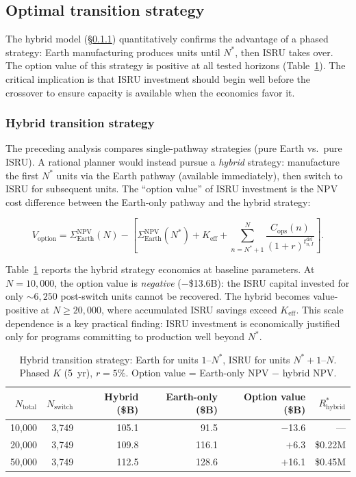 \documentclass[preprint,12pt]{elsarticle}
\begin{document}
\subsection{Optimal transition strategy}

The hybrid model (\S\ref{sec:hybrid}) quantitatively confirms the advantage of a phased strategy: Earth manufacturing produces units until $N^*$, then ISRU takes over. The option value of this strategy is positive at all tested horizons (Table~\ref{tab:hybrid}). The critical implication is that ISRU investment should begin well before the crossover to ensure capacity is available when the economics favor it.

\subsubsection{Hybrid transition strategy}
\label{sec:hybrid}

The preceding analysis compares single-pathway strategies (pure Earth vs.\ pure ISRU). A rational planner would instead pursue a \emph{hybrid} strategy: manufacture the first $N^*$ units via the Earth pathway (available immediately), then switch to ISRU for subsequent units. The ``option value'' of ISRU investment is the NPV cost difference between the Earth-only pathway and the hybrid strategy:

\begin{equation}
  V_{\mathrm{option}} = \Sigma_{\mathrm{Earth}}^{\mathrm{NPV}}(N) - \left[\Sigma_{\mathrm{Earth}}^{\mathrm{NPV}}(N^*) + K_{\mathrm{eff}} + \sum_{n=N^*+1}^{N} \frac{C_{\mathrm{ops}}(n)}{(1+r)^{t_{n,I}^{\mathrm{del}}}}\right].
  \label{eq:hybrid}
\end{equation}

Table~\ref{tab:hybrid} reports the hybrid strategy economics at baseline parameters. At $N = 10{,}000$, the option value is \emph{negative} ($-$\$13.6B): the ISRU capital invested for only ${\sim}6{,}250$ post-switch units cannot be recovered. The hybrid becomes value-positive at $N \geq 20{,}000$, where accumulated ISRU savings exceed $K_{\mathrm{eff}}$. This scale dependence is a key practical finding: ISRU investment is economically justified only for programs committing to production well beyond $N^*$.

\begin{table}[htbp]
\centering
\caption{Hybrid transition strategy: Earth for units $1$--$N^*$, ISRU for units $N^*+1$--$N$. Phased $K$ (5~yr), $r = 5\%$. Option value = Earth-only NPV $-$ hybrid NPV.}
\label{tab:hybrid}
\small
\begin{tabular}{@{}rrrrrr@{}}
\toprule
$N_{\mathrm{total}}$ & $N_{\mathrm{switch}}$ & Hybrid (\$B) & Earth-only (\$B) & Option value (\$B) & $R^*_{\mathrm{hybrid}}$ \\
\midrule
10{,}000  & 3{,}749  & 105.1 & 91.5 & $-$13.6 & --- \\
20{,}000  & 3{,}749  & 109.8 & 116.1 & $+$6.3 & \$0.22M \\
50{,}000  & 3{,}749  & 112.5 & 128.6 & $+$16.1 & \$0.45M \\
\bottomrule
\end{tabular}
\end{table}
\end{document}
